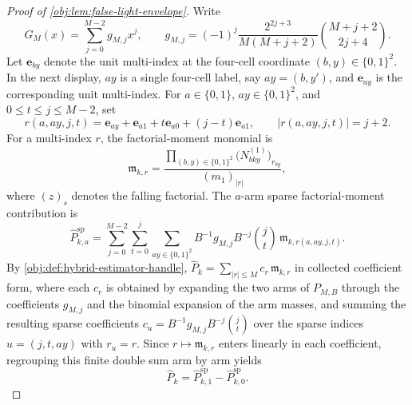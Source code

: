 \begin{proof}[Proof of \cref{obj:lem:false-light-envelope}]
Write
\[
G_M(x)=\sum_{j=0}^{M-2}g_{M,j}x^j,
\qquad
 g_{M,j}=(-1)^j
 \frac{2^{2j+3}}{M(M+j+2)}\binom{M+j+2}{2j+4}.
\]
Let \(\mathbf e_{by}\) denote the unit multi-index at the four-cell coordinate \((b,y)\in\{0,1\}^2\).  In the next display, \(ay\) is a single four-cell label, say \(ay=(b,y')\), and \(\mathbf e_{ay}\) is the corresponding unit multi-index.  For \(a\in\{0,1\}\), \(ay\in\{0,1\}^2\), and \(0\le t\le j\le M-2\), set
\[
r(a,ay,j,t)
=
\mathbf e_{ay}+\mathbf e_{a1}+t\mathbf e_{a0}+(j-t)\mathbf e_{a1},
\qquad |r(a,ay,j,t)|=j+2.
\]
For a multi-index \(r\), the factorial-moment monomial is
\[
\mathfrak m_{k,r}
=
\frac{\prod_{(b,y)\in\{0,1\}^2}
\bigl(N^{(1)}_{bky}\bigr)_{r_{by}}}
{(m_1)_{|r|}},
\]
where \((z)_s\) denotes the falling factorial.  The \(a\)-arm sparse factorial-moment contribution is
\[
\widehat P_{k,a}^{\mathrm{sp}}
=
\sum_{j=0}^{M-2}\sum_{t=0}^j\sum_{ay\in\{0,1\}^2}
B^{-1}g_{M,j}B^{-j}\binom jt\,
\mathfrak m_{k,r(a,ay,j,t)}.
\]
By \cref{obj:def:hybrid-estimator-handle}, \(\widehat P_k=\sum_{|r|\le M}c_r\,\mathfrak m_{k,r}\) in collected coefficient form, where each \(c_r\) is obtained by expanding the two arms of \(P_{M,B}\) through the coefficients \(g_{M,j}\) and the binomial expansion of the arm masses, and summing the resulting sparse coefficients \(c_u=B^{-1}g_{M,j}B^{-j}\binom jt\) over the sparse indices \(u=(j,t,ay)\) with \(r_u=r\).  Since \(r\mapsto\mathfrak m_{k,r}\) enters linearly in each coefficient, regrouping this finite double sum arm by arm yields
\[
\widehat P_k=\widehat P_{k,1}^{\mathrm{sp}}-
\widehat P_{k,0}^{\mathrm{sp}} .
\]


\end{proof}
